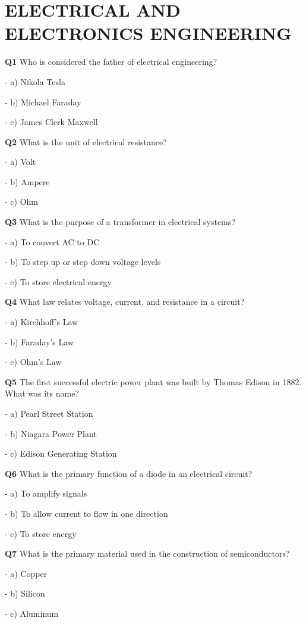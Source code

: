 \section{ELECTRICAL AND ELECTRONICS ENGINEERING}

\textbf{Q1} Who is considered the father of electrical engineering?\par
\quad - a) Nikola Tesla\par
\quad - b) Michael Faraday\par
\quad - c) James Clerk Maxwell\par

\textbf{Q2} What is the unit of electrical resistance?\par
\quad - a) Volt\par
\quad - b) Ampere\par
\quad - c) Ohm\par

\textbf{Q3} What is the purpose of a transformer in electrical systems?\par
\quad - a) To convert AC to DC\par
\quad - b) To step up or step down voltage levels\par
\quad - c) To store electrical energy\par

\textbf{Q4} What law relates voltage, current, and resistance in a circuit?\par
\quad - a) Kirchhoff's Law\par
\quad - b) Faraday's Law\par
\quad - c) Ohm's Law\par

\textbf{Q5} The first successful electric power plant was built by Thomas Edison in 1882. What was its name?\par
\quad - a) Pearl Street Station\par
\quad - b) Niagara Power Plant\par
\quad - c) Edison Generating Station\par

\textbf{Q6} What is the primary function of a diode in an electrical circuit?\par
\quad - a) To amplify signals\par
\quad - b) To allow current to flow in one direction\par
\quad - c) To store energy\par

\textbf{Q7} What is the primary material used in the construction of semiconductors?\par
\quad - a) Copper\par
\quad - b) Silicon\par
\quad - c) Aluminum\par

